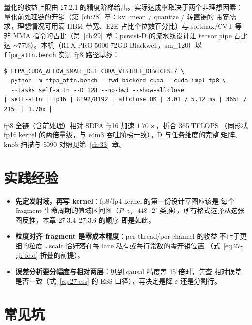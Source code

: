 量化的收益上限由 27.2.1 的精度阶梯给出。实际达成率取决于两个非理想因素：
量化前处理链的开销（第~\ref{ch:28}~章：kv\_mean / quantize / 转置链的
带宽需求，理想情况可用满 HBM 带宽、E2E 占比个位数百分比）与 softmax/CVT 等
非 MMA 指令的占比（第~\ref{ch:29}~章：persist-D 的流水线设计让 tensor pipe 占比
达 $\sim$77\%）。本机（RTX PRO 5000 72GB Blackwell，sm\_120）以
\texttt{ffpa\_attn.bench} 实测 fp8 路径基线：
\begin{lstlisting}[style=console]
$ FFPA_CUDA_ALLOW_SMALL_D=1 CUDA_VISIBLE_DEVICES=7 \
  python -m ffpa_attn.bench --fwd-backend cuda --cuda-impl fp8 \
  --tasks self-attn --D 128 --no-bwd --show-allclose
| self-attn | fp16 | 8192/8192 | allclose OK | 3.01 / 5.12 ms | 365T / 215T | 1.70x |
\end{lstlisting}
fp8 全链（含前处理）相对 SDPA fp16 加速 $1.70\times$，折合 365 TFLOPS
（同形状 fp16 kernel 的两倍量级，与 e4m3 吞吐阶梯一致）。D 与任务维度的完整
矩阵、knob 扫描与 5090 对照见第~\ref{ch:33}~章。

\section{实践经验}

\begin{itemize}[itemsep=2pt,topsep=2pt]
  \item \textbf{先定发射域，再写 kernel}：fp8/fp4 kernel 的第一份设计草图应该是
        每个 fragment 生命周期的值域区间图（$P \cdot v_s \cdot 448 \cdot
        2^{\tau}$ 类推），所有格式选择从这张图反推，本章 27.3.4--27.3.6 的顺序
        即是如此。
  \item \textbf{粒度对齐 fragment 是零成本精度}：per-thread/per-channel 的收益
        不止于更细的粒度：scale 恰好落在每 lane 私有或每行常数的零开销位置
        （式~\ref{eq:27-qk-fold} 折叠的前提）。
  \item \textbf{误差分析要分幅度与相对两层}：见到 causal 精度差 15 倍时，先查
        相对误差是否一致（式~\ref{eq:27-ess} 的 ESS 口径），再决定是降
        $\varepsilon$ 还是分割行。
\end{itemize}

\section{常见坑}

